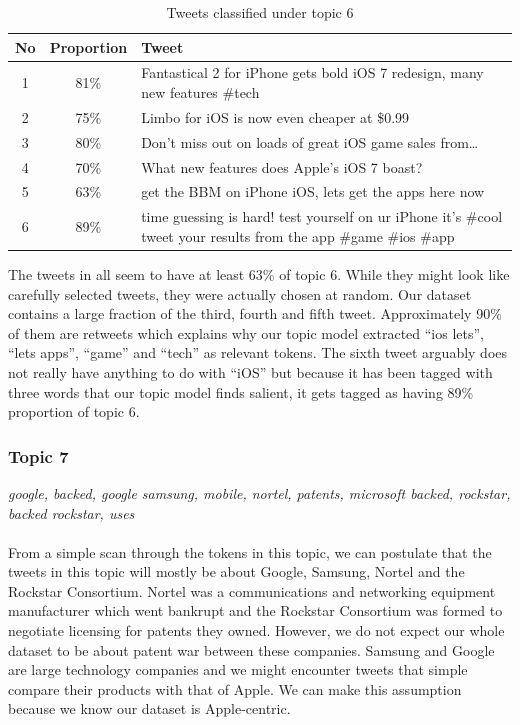\begin{table}[H]
  \begin{tabular}{c c p{13cm}} \toprule
    No & Proportion & Tweet \\ \midrule
    1  & 81\%       & Fantastical 2 for iPhone gets bold iOS 7 redesign, many new features \#tech \\ \midrule
    2  & 75\%       & Limbo for iOS is now even cheaper at \$0.99 \\ \midrule
    3  & 80\%       & Don't miss out on loads of great iOS game sales from\ldots \\ \midrule
    4  & 70\%       & What new features does Apple's iOS 7 boast? \\ \midrule
    5  & 63\%       & get the BBM on iPhone iOS, lets get the apps here now \\ \midrule
    6  & 89\%       & time guessing is hard! test yourself on ur iPhone it's \#cool tweet your
    results from the app \#game \#ios \#app \\ \bottomrule
  \end{tabular}
  \caption{Tweets classified under topic 6}
  \label{tab:topic-6-tweets}
\end{table}

The tweets in  all seem to have at least 63\% of topic 6. While they
might look like carefully selected tweets, they were actually chosen at random. Our dataset contains
a large fraction of the third, fourth and fifth tweet. Approximately 90\% of them are retweets which
explains why our topic model extracted ``ios lets'', ``lets apps'', ``game'' and ``tech'' as
relevant tokens. The sixth tweet arguably does not really have anything to do with ``iOS'' but
because it has been tagged with three words that our topic model finds salient, it gets tagged as
having 89\% proportion of topic 6.



\subsubsection{Topic 7}
\label{sec:topic-7}
\textit{google, backed, google samsung, mobile, nortel, patents, microsoft backed, rockstar, backed
rockstar, uses } \\\\
From a simple scan through the tokens in this topic, we can postulate that the tweets in this topic
will mostly be about Google, Samsung, Nortel and the Rockstar Consortium. Nortel was a
communications and networking equipment manufacturer which went bankrupt and the Rockstar Consortium
was formed to negotiate licensing for patents they owned. However, we do not expect our whole
dataset to be about patent war between these companies. Samsung and Google are large technology
companies and we might encounter tweets that simple compare their products with that of Apple. We
can make this assumption because we know our dataset is Apple-centric.

